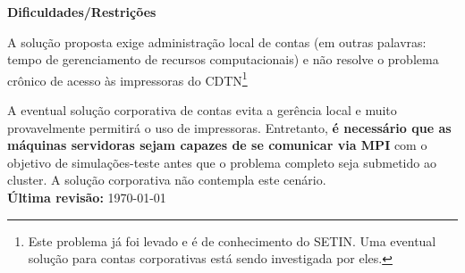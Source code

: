 \textbf{Dificuldades/Restrições}

A solução proposta exige administração local de contas (em outras palavras: tempo 
de gerenciamento de recursos computacionais) e não resolve o problema crônico 
de acesso às impressoras do CDTN\footnote{Este problema já foi levado e é de conhecimento do SETIN. Uma eventual solução para contas corporativas está sendo 
investigada por eles.}

A eventual solução corporativa de contas evita a gerência local e muito provavelmente permitirá o uso de impressoras. Entretanto, \textbf{é necessário 
que as máquinas servidoras sejam capazes de se comunicar via MPI} com o objetivo 
de simulações-teste antes que o problema completo seja submetido ao cluster. A 
solução corporativa não contempla este cenário.\\

\textbf{Última revisão:} \today
